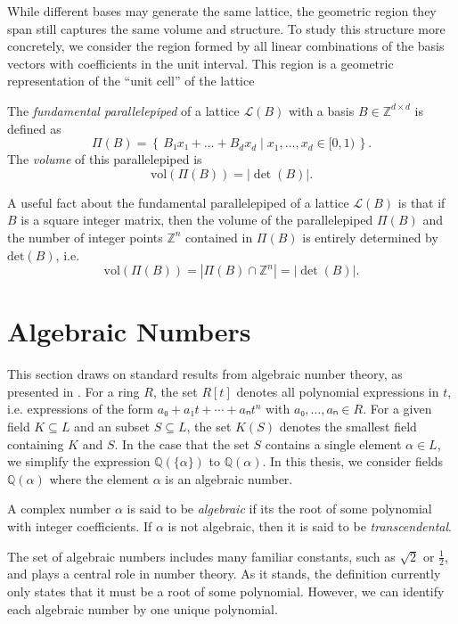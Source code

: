 While different bases may generate the same lattice, the geometric region they
span still captures the same volume and structure.
To study this structure more concretely, we consider the region formed by all
linear combinations of the basis vectors with coefficients in the unit
interval.
This region is a geometric representation of the “unit cell” of the lattice

\begin{definition}
  The \emph{fundamental parallelepiped} of a lattice $\mathcal{L}(B)$ with a basis $B ∈ ℤ^{d×d}$ is defined as
  \[
    Π(B) = \left\{\, B₁ x₁ + \dots + B_d x_d \mid x_1, \dots, x_d ∈ [0, 1) \,\right\}.
  \]
  The \emph{volume} of this parallelepiped is
  \[
    \mathrm{vol}(Π(B)) = |\det(B)|.
  \]
\end{definition}

A useful fact about the fundamental parallelepiped of a lattice $\mathcal L(B)$
is that if $B$ is a square integer matrix, then the volume of the
parallelepiped $Π(B)$ and the number of integer points $ℤ^n$ contained in
$Π(B)$ is entirely determined by $\mathrm{det}(B)$, i.e.
\[
  \mathrm{vol}(Π(B)) = |Π(B) ∩ ℤ^n| = |\det(B)|.
\]

\section{Algebraic Numbers}

This section draws on standard results from algebraic number theory, as presented in \cite{Dummit04}.
For a ring $R$,
the set $R[t]$ denotes all polynomial expressions in $t$,
i.e. expressions of the form $a₀ + a₁ t + ⋯ + aₙ t^n$ with $a₀, …, aₙ ∈ R$.
For a given field $K ⊆ L$ and an subset $S ⊆ L$,
the set $K(S)$ denotes the smallest field containing $K$ and $S$.
In the case that the set $S$ contains a single element $α ∈ L$, we simplify the
expression $ℚ(\{α\})$ to $ℚ(α)$.
In this thesis, we consider fields $ℚ(α)$ where the element $α$ is an algebraic number.

\begin{definition}
  A complex number $α$ is said to be \emph{algebraic} if its the root of some polynomial
  with integer coefficients.
  If $α$ is not algebraic, then it is said to be \emph{transcendental}.
\end{definition}

The set of algebraic numbers includes many familiar constants, such as $\sqrt{2}$ or $\frac{1}{2}$,
and plays a central role in number theory.
As it stands, the definition currently only states that it must be a root of some polynomial.
However, we can identify each algebraic number by one unique polynomial.

